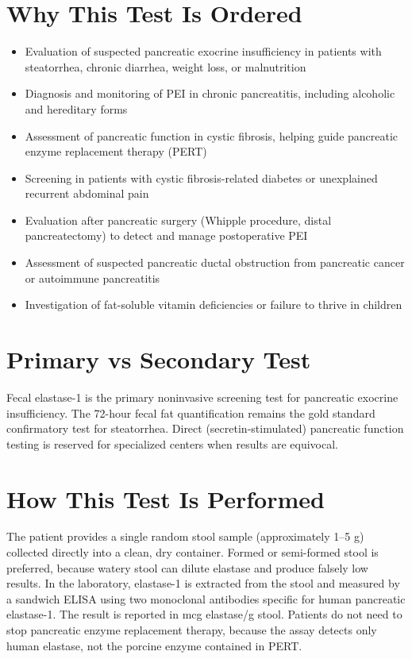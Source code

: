 \section*{Why This Test Is Ordered}
\begin{itemize}
  \item Evaluation of suspected pancreatic exocrine insufficiency in patients with steatorrhea, chronic diarrhea, weight loss, or malnutrition
  \item Diagnosis and monitoring of PEI in chronic pancreatitis, including alcoholic and hereditary forms
  \item Assessment of pancreatic function in cystic fibrosis, helping guide pancreatic enzyme replacement therapy (PERT)
  \item Screening in patients with cystic fibrosis-related diabetes or unexplained recurrent abdominal pain
  \item Evaluation after pancreatic surgery (Whipple procedure, distal pancreatectomy) to detect and manage postoperative PEI
  \item Assessment of suspected pancreatic ductal obstruction from pancreatic cancer or autoimmune pancreatitis
  \item Investigation of fat-soluble vitamin deficiencies or failure to thrive in children
\end{itemize}
\section*{Primary vs Secondary Test}
Fecal elastase-1 is the primary noninvasive screening test for pancreatic exocrine insufficiency. The 72-hour fecal fat quantification remains the gold standard confirmatory test for steatorrhea. Direct (secretin-stimulated) pancreatic function testing is reserved for specialized centers when results are equivocal.
\section*{How This Test Is Performed}
The patient provides a single random stool sample (approximately 1--5 g) collected directly into a clean, dry container. Formed or semi-formed stool is preferred, because watery stool can dilute elastase and produce falsely low results. In the laboratory, elastase-1 is extracted from the stool and measured by a sandwich ELISA using two monoclonal antibodies specific for human pancreatic elastase-1. The result is reported in mcg elastase/g stool. Patients do not need to stop pancreatic enzyme replacement therapy, because the assay detects only human elastase, not the porcine enzyme contained in PERT.
